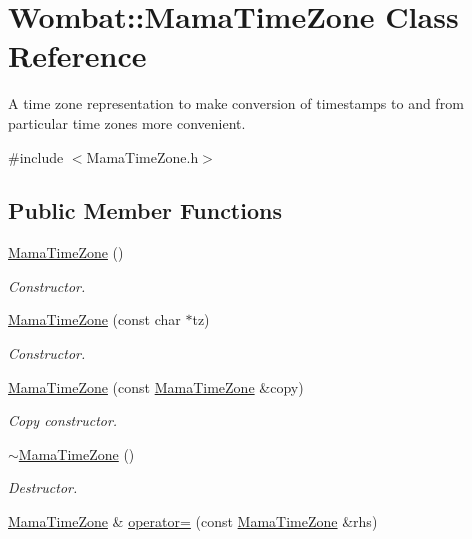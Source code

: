 \hypertarget{classWombat_1_1MamaTimeZone}{
\section{Wombat::MamaTimeZone Class Reference}
\label{classWombat_1_1MamaTimeZone}
}


A time zone representation to make conversion of timestamps to and from particular time zones more convenient.  


{\ttfamily \#include $<$MamaTimeZone.h$>$}\subsection*{Public Member Functions}
\begin{DoxyCompactItemize}
\item 
\hyperlink{classWombat_1_1MamaTimeZone_a3987db671f0f4934c7399cbb5f69466f}{MamaTimeZone} ()
\begin{DoxyCompactList}\small\item\em Constructor. \item\end{DoxyCompactList}\item 
\hyperlink{classWombat_1_1MamaTimeZone_a02ac0801fcc3f4e7684b7c365e38f551}{MamaTimeZone} (const char $\ast$tz)
\begin{DoxyCompactList}\small\item\em Constructor. \item\end{DoxyCompactList}\item 
\hyperlink{classWombat_1_1MamaTimeZone_ad13aa55fee7c8a5a2054e0d961a6db22}{MamaTimeZone} (const \hyperlink{classWombat_1_1MamaTimeZone}{MamaTimeZone} \&copy)
\begin{DoxyCompactList}\small\item\em Copy constructor. \item\end{DoxyCompactList}\item 
\hyperlink{classWombat_1_1MamaTimeZone_a0ae3e20777724ed1b27eeda695eee728}{$\sim$MamaTimeZone} ()
\begin{DoxyCompactList}\small\item\em Destructor. \item\end{DoxyCompactList}\item 
\hyperlink{classWombat_1_1MamaTimeZone}{MamaTimeZone} \& \hyperlink{classWombat_1_1MamaTimeZone_a8d33239cb78b37ea4f7335d93a41e32e}{operator=} (const \hyperlink{classWombat_1_1MamaTimeZone}{MamaTimeZone} \&rhs)

\end{DoxyCompactItemize}
